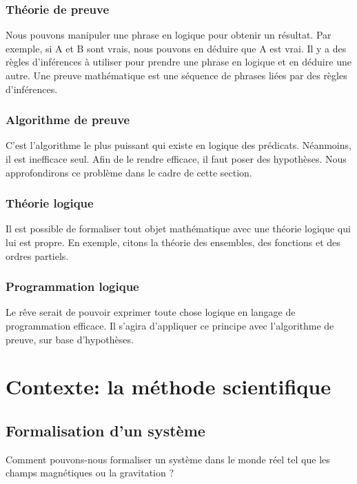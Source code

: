 \subsection{Théorie de preuve}

Nous pouvons manipuler une phrase en logique pour obtenir un résultat. Par exemple, si A et B sont vrais, nous pouvons en déduire que A est vrai. Il y a des règles d'inférences à utiliser pour prendre une phrase en logique et en déduire une autre.
Une preuve mathématique est une séquence de phrases liées par des règles d'inférences.

\subsection{Algorithme de preuve}
C'est l'algorithme le plus puissant qui existe en logique des prédicats. Néanmoins, il est inefficace seul. Afin de le rendre efficace, il faut poser des hypothèses. Nous approfondirons ce problème dans le cadre de cette section. 

\subsection{Théorie logique}

Il est possible de formaliser tout objet mathématique avec une théorie logique qui lui est propre.  En exemple, citons la théorie des ensembles, des fonctions et des ordres partiels.

\subsection{Programmation logique}

Le rêve serait de pouvoir exprimer toute chose logique en langage de programmation efficace. Il s'agira d'appliquer ce principe avec l'algorithme de preuve, sur base d'hypothèses.

\newpage
\chapter{Contexte: la méthode scientifique}

\section{Formalisation d'un système}

Comment pouvons-nous formaliser un système dans le monde réel tel que les champs magnétiques ou la gravitation ?

